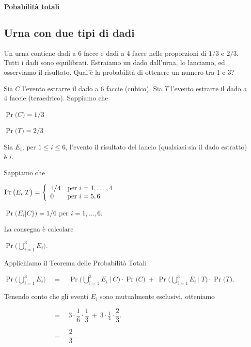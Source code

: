 \documentclass[11pt,openany]{book}
\begin{document}
\clearpage
\hfill\textbf{{\color{brown}\hyperref[TeoremaProbabilitaTotali]{Pobabilità totali} \faShare}}
\subsection{Urna con due tipi di dadi}
\label{dadi_diversi}

Un urna contiene dadi a 6 facce e dadi a 4 facce nelle proporzioni di $1/3$ e $2/3$.
Tutti i dadi sono equilibrati.
Estraiamo un dado dall'urna, lo lanciamo, ed osserviamo il risultato.
Qual'è la probabilità di ottenere un numero tra 1 e 3?

\begin{soluzione}
Sia $C$ l'evento estrarre il dado a $6$ faccie (cubico). 
Sia $T$ l'evento estrarre il dado a $4$ faccie (teraedrico). 
Sappiamo che 

\qquad$\Pr\big(C\big)=1/3$ 

\qquad$\Pr\big(T\big)=2/3$ 

Sia $E_i$, per $1\le i\le 6$, l'evento  il risultato del lancio (qualsiasi sia il dado estratto) \`e $i$.

Sappiamo che

\qquad$\Pr\big(E_i\vert T\big)=\left\{
\begin{array}[c]{ll}
    1/4&\textrm{per }i=1,\dots,4\\
    0&\textrm{per }i=5, 6\\
\end{array}\right.$

\qquad$\Pr\big(E_i\vert C\}\big)=1/6$ per $i=1,\dots,6$.

La consegna è calcolare

\qquad$\displaystyle\Pr\bigg(\bigcup_{i=1}^3E_i\bigg)$.

Applichiamo il Teorema delle Probabilità Totali

\qquad$\displaystyle\Pr\bigg(\bigcup_{i=1}^3E_i\bigg)\quad=\quad
\Pr\bigg(\bigcup_{i=1}^3E_i\ \Big|\ C\bigg)\cdot\Pr\big(C\big)\ +\ 
\Pr\bigg(\bigcup_{i=1}^3E_i\ \Big|\ T\bigg)\cdot\Pr\big(T\big)
$.

Tenendo conto che gli eventi $E_i$ sono mutualmente esclusivi, otteniamo

\qquad$\displaystyle\phantom{\Pr\bigg(\bigcup_{i=1}^3E_i\bigg)}\quad=\quad
3\cdot\dfrac16\cdot\dfrac13\ +\ 
3\cdot\frac14\cdot\dfrac23
$.

\qquad$\displaystyle\phantom{\Pr\bigg(\bigcup_{i=1}^3E_i\bigg)}\quad=\quad
\dfrac{2}{3}
$.
\end{soluzione}
\end{document}
